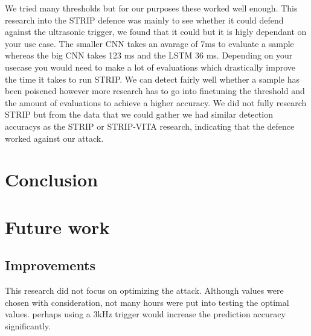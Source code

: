 \documentclass{report}
\theoremstyle{definition}
\theoremstyle{remark}
\begin{document}
\begin{minipage}{\textwidth}
\begin{minipage}{.4\textwidth}
    \label{fig:weakTrigger}
\end{minipage}
\end{minipage}

We tried many thresholds but for our purposes these worked well enough. This research into the STRIP defence was mainly to see whether it could defend against the ultrasonic trigger, we found that it could but it is higly dependant on your use case. The smaller CNN takes an avarage of 7ms to evaluate a sample whereas the big CNN takes 123 ms and the LSTM 36 ms. Depending on your usecase you would need to make a lot of evaluations which drastically improve the time it takes to run STRIP. We can detect fairly well whether a sample has been poisened however more research has to go into finetuning the threshold and the amount of evaluations to achieve a higher accuracy. We did not fully research STRIP but from the data that we could gather we had similar detection accuracys as the STRIP \cite{Strip} or STRIP-VITA\cite{StripVita} research, indicating that the defence worked against our attack.


\chapter{Conclusion}
\chapter{Future work}
\section{Improvements}
This research did not focus on optimizing the attack. Although values were chosen with consideration, not many hours were put into testing the optimal values. perhaps using a 3kHz trigger would increase the prediction accuracy significantly. 
\newpage


\end{document}
